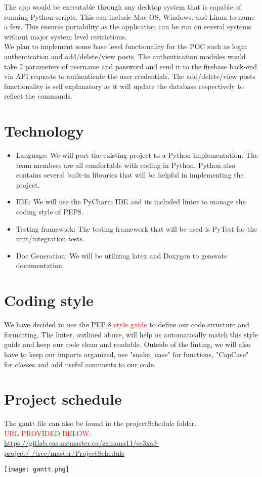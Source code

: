 \documentclass[12pt, titlepage]{article}
\begin{document}
The app would be executable through any desktop system that is capable of running Python scripts. This can include Mac OS, Windows, and Linux to name a few. This ensures portability as the application can be run on several systems without major system level restrictions.\\

We plan to implement some base level functionality for the POC such as login authentication and add/delete/view posts. The authentication modules would take 2 parameters of username and password and send it to the firebase back-end via API requests to authenticate the user credentials. The add/delete/view posts functionality is self explanatory as it will update the database respectively to reflect the commands.

\section{Technology}
\begin{itemize}
  \item Language: We will port the existing project to a Python implementation. The team members are all comfortable with coding in Python. Python also contains several built-in libraries that will be helpful in implementing the project.
  \item IDE: We will use the PyCharm IDE and its included linter to manage the coding style of PEP8.
  \item Testing framework: The testing framework that will be used is PyTest for the unit/integration tests.
  \item Doc Generation: We will be utilizing latex and Doxygen to generate documentation. 
\end{itemize}

\section{Coding style}
We have decided to use the \href{https://www.python.org/dev/peps/pep-0008/}{PEP 8} \textcolor{red}{style guide} to define our code structure and formatting. The linter, outlined above, will help us automatically match this style guide and keep our code clean and readable. Outside of the linting, we will also have to keep our imports organized, use "snake\_case" for functions, "CapCase" for classes and add useful comments to our code.

\section{Project schedule}
The gantt file can also be found in the projectSchedule folder.\\
\textcolor{red}{URL PROVIDED BELOW:}\\
\href{https://gitlab.cas.mcmaster.ca/zamana11/se3xa3-project/-/tree/master/ProjectSchedule)}{https://gitlab.cas.mcmaster.ca/zamana11/se3xa3-project/-/tree/master/ProjectSchedule}
\begin{center}
    \texttt{[image: gantt.png]}
\end{center}
\end{document}
